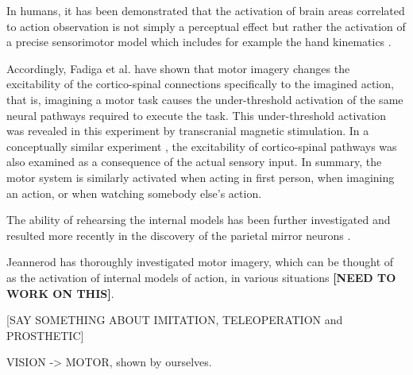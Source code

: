 In humans, it has been demonstrated that the activation of brain areas correlated to 
action observation is not simply a perceptual effect but rather the activation of
a precise sensorimotor model which includes for example the hand kinematics \cite{pozzo-06}.
 
Accordingly, Fadiga et al. \cite{} have shown that motor imagery changes the excitability
of the cortico-spinal connections specifically to the imagined action, that is, 
imagining a motor task causes the under-threshold activation of the same neural pathways 
required to execute the task. This under-threshold activation was revealed in this experiment 
by transcranial magnetic stimulation. In a conceptually similar experiment \cite{}, the 
excitability of cortico-spinal pathways was also examined as a consequence of the actual 
sensory input. In summary, the motor system is similarly activated when acting in first
person, when imagining an action, or when watching somebody else's action.

The ability of rehearsing the internal models has been further investigated and 
resulted more recently in the discovery of the parietal mirror neurons \cite{}.

Jeannerod \cite{} has thoroughly investigated motor imagery, which can be thought of as the 
activation of internal models of action, in various situations {\bf [NEED TO WORK ON THIS]}.

[SAY SOMETHING ABOUT IMITATION, TELEOPERATION and PROSTHETIC]

VISION -> MOTOR, shown by ourselves.